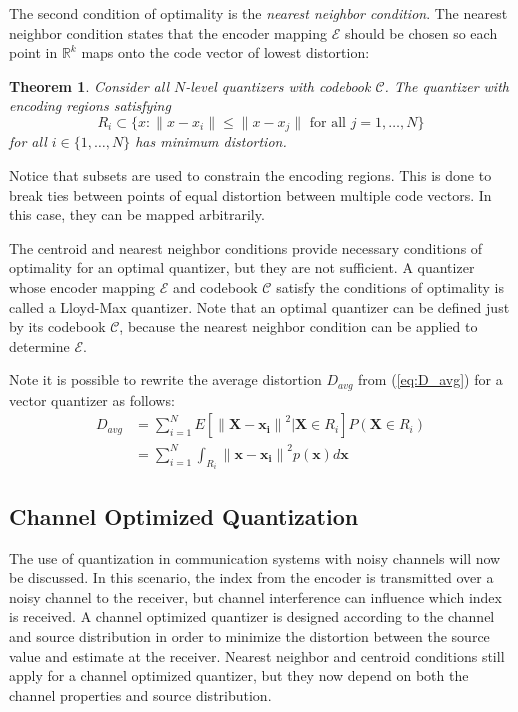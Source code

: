 \documentclass[10pt]{article}
\newtheorem{theorem}{Theorem}[section]
\begin{document}
The second condition of optimality is the \emph{nearest neighbor condition}. The nearest neighbor condition states that the encoder mapping $\mathcal{E}$ should be chosen so each point in $\mathbb{R}^k$ maps onto the code vector of lowest distortion:

\begin{theorem}
Consider all $N$-level quantizers with codebook $\mathcal{C}$. The quantizer with encoding regions satisfying
\begin{equation}
R_i \subset \{x : \| x - x_i \| \le \| x - x_j \| \text{ for all } j = 1,\ldots,N \}
\end{equation}
for all $i \in \{1,\ldots,N\}$ has minimum distortion.
\end{theorem}

Notice that subsets are used to constrain the encoding regions. This is done to break ties between points of equal distortion between multiple code vectors. In this case, they can be mapped arbitrarily.

The centroid and nearest neighbor conditions provide necessary conditions of optimality for an optimal quantizer, but they are not sufficient. A quantizer whose encoder mapping $\mathcal{E}$ and codebook $\mathcal{C}$ satisfy the conditions of optimality is called a Lloyd-Max quantizer. Note that an optimal quantizer can be defined just by its codebook $\mathcal{C}$, because the nearest neighbor condition can be applied to determine $\mathcal{E}$.

Note it is possible to rewrite the average distortion $D_{avg}$ from (\ref{eq:D_avg}) for a vector quantizer as follows:
\begin{align}
D_{avg} &= \sum_{i=1}^{N} E[ {\| \mathbf{X} -  \mathbf{x_i}\|}^2 | \mathbf{X} \in R_i] P(\mathbf{X} \in R_i) \\
&= \sum_{i=1}^{N} \int_{R_i} {\|\mathbf{x} - \mathbf{x_i}\|}^2 p(\mathbf{x}) d\mathbf{x}
\end{align}

\subsection{Channel Optimized Quantization}
\label{sec:channel_optimized}
The use of quantization in communication systems with noisy channels will now be discussed. In this scenario, the index from the encoder is transmitted over a noisy channel to the receiver, but channel interference can influence which index is received. A channel optimized quantizer is designed according to the channel and source distribution in order to minimize the distortion between the source value and estimate at the receiver. Nearest neighbor and centroid conditions still apply for a channel optimized quantizer, but they now depend on both the channel properties and source distribution.
\end{document}
